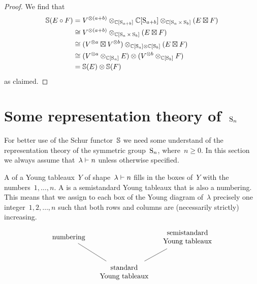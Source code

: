 \documentclass[a4paper,10pt]{scrartcl}
\begin{document}
\begin{proof}
  We find that
  \begin{align*}
    \mathbb{S}(E \circ F)
    &=
    V^{\otimes (a+b)}
    \otimes_{\mathbb{C}[\operatorname{S}_{a+b}]}
    \mathbb{C}[\operatorname{S}_{a+b}]
    \otimes_{\mathbb{C}[\operatorname{S}_a \times \operatorname{S}_b]}
    (E \boxtimes F)
    \\
    &\cong
    V^{\otimes (a+b)}
    \otimes_{\mathbb{C}[\operatorname{S}_a \times \operatorname{S}_b]}
    (E \boxtimes F)
    \\
    &\cong
    (V^{\otimes a} \boxtimes V^{\otimes b})
    \otimes_{\mathbb{C}[\operatorname{S}_a] \otimes \mathbb{C}[\operatorname{S}_b]}
    (E \boxtimes F)
    \\
    &\cong
    (V^{\otimes a} \otimes_{\mathbb{C}[\operatorname{S}_a]} E)
    \otimes
    (V^{\otimes b} \otimes_{\mathbb{C}[\operatorname{S}_b]} F)
    \\
    &=
    \mathbb{S}(E) \otimes \mathbb{S}(F)
  \end{align*}
  as claimed.
\end{proof}





\section{Some representation theory of~$\operatorname{S}_n$}

For better use of the Schur functor~$\mathbb{S}$ we need some understand of the representation theory of the symmetric group~$\operatorname{S}_n$, where~$n \geq 0$.
In this section we always assume that~$\lambda \vdash n$ unless otherwise specified.

A  of a Young tableaux~$Y$ of shape~$\lambda \vdash n$ fills in the boxes of~$Y$ with the numbers~$1, \dotsc, n$.
A  is a semistandard Young tableaux that is also a numbering.
This means that we assign to each box of the Young diagram of~$\lambda$ precisely one integer~$1, 2, \dotsc, n$ such that both rows and columns are (necessarily strictly) increasing.
\[
  \begin{tikzcd}[column sep = small]
    \text{numbering}
    \arrow[dash]{dr}
    &
    {}
    &
    \begin{tabular}{@{}c@{}}
      semistandard \\
      Young tableaux
    \end{tabular}
    \arrow[dash]{dl}
    \\
    {}
    &
    \begin{tabular}{@{}c@{}}
      standard \\
      Young tableaux
    \end{tabular}
    &
    {}
  \end{tikzcd}
\]
\end{document}
